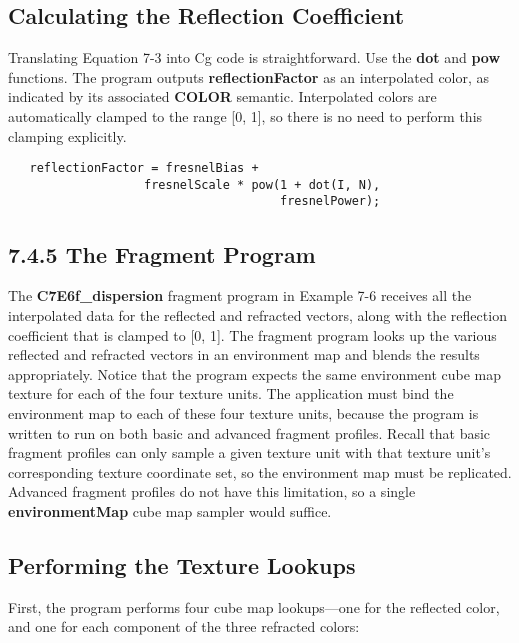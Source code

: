 \documentclass[../main.tex]{subfiles}
\begin{document}
\subsection*{Calculating the Reflection Coefficient}

Translating Equation 7-3 into Cg code is straightforward. Use the \textbf{dot} and \textbf{pow} functions. The program outputs \textbf{reflectionFactor} as an interpolated color, as indicated by its associated \textbf{COLOR} semantic. Interpolated colors are automatically clamped to the range [0, 1], so there is no need to perform this clamping explicitly.

\FloatBarrier
\begin{lstlisting}
   reflectionFactor = fresnelBias +
                   fresnelScale * pow(1 + dot(I, N),
                                      fresnelPower);
\end{lstlisting}
\FloatBarrier

\subsection{7.4.5 The Fragment Program}

The \textbf{C7E6f_dispersion} fragment program in Example 7-6 receives all the interpolated data for the reflected and refracted vectors, along with the reflection coefficient that is clamped to [0, 1]. The fragment program looks up the various reflected and refracted vectors in an environment map and blends the results appropriately. Notice that the program expects the same environment cube map texture for each of the four texture units. The application must bind the environment map to each of these four texture units, because the program is written to run on both basic and advanced fragment profiles. Recall that basic fragment profiles can only sample a given texture unit with that texture unit's corresponding texture coordinate set, so the environment map must be replicated. Advanced fragment profiles do not have this limitation, so a single \textbf{environmentMap} cube map sampler would suffice.

\subsection*{Performing the Texture Lookups}

First, the program performs four cube map lookups—one for the reflected color, and one for each component of the three refracted colors:
\end{document}
